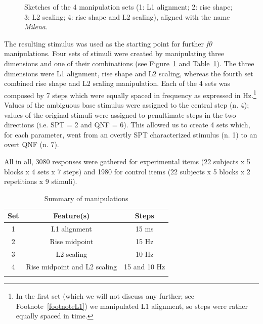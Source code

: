 \begin{figure}[p]
\centering
{}
\caption{Sketches of the 4 manipulation sets (1: L1 alignment; 2: rise shape; 3: L2 scaling; 4: rise shape and L2 scaling), aligned with the name \textit{Milena}.}
\label{fig304}\end{figure}


The resulting stimulus was used as the starting point for further \textit{f0} manipulations. Four sets of stimuli were created by manipulating three dimensions and one of their combinations (see Figure~\ref{fig304} and Table~\ref{tab31}). The three dimensions were L1 alignment, rise shape and L2 scaling, whereas the fourth set combined rise shape and L2 scaling manipulation. Each of the 4 sets was composed by 7 steps which were equally spaced in frequency as expressed in Hz.\footnote{In the first set (which we will not discuss any further; see Footnote~\ref{footnoteL1}) we manipulated L1 alignment, so steps were rather equally spaced in time.} Values of the ambiguous base stimulus were assigned to the central step (n. 4); values of the original stimuli were assigned to penultimate steps in the two directions (i.e. SPT = 2 and QNF = 6). This allowed us to create 4 sets which, for each parameter, went from an overtly SPT characterized stimulus (n. 1) to an overt QNF (n. 7). 


All in all, 3080 responses were gathered for experimental items (22 subjects x 5 blocks x 4 sets x 7 steps) and 1980 for control items (22 subjects x 5 blocks x 2 repetitions x 9 stimuli).


\begin{table}[t]
\centering
\begin{tabular}{c c c}
\mytoprule
Set & Feature(s) & Steps \\
\midrule
1 & L1 alignment & 15 ms \\
2 & Rise midpoint & 15 Hz \\
3 & L2 scaling & 10 Hz \\
4 & Rise midpoint and L2 scaling & 15 and 10 Hz \\
\mybottomrule
\end{tabular}
\caption{Summary of manipulations}
\label{tab31}\end{table}


